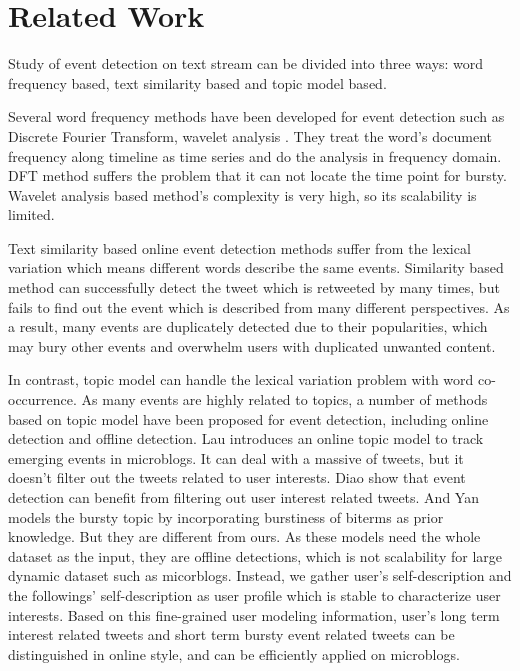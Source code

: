 \documentclass[runningheads,a4paper]{llncs}
\begin{document}
\section{Related Work}
Study of event detection on text stream can be divided into three ways: word frequency based, text similarity based and topic model based.

Several word frequency methods have been developed for event detection such as Discrete Fourier Transform\cite{he2007analyzingDFT}, wavelet analysis \cite{weng2011eventWavelet}.
They treat the word's document frequency along timeline as time series and do the analysis in frequency domain. 
DFT method suffers the problem that it can not locate the time point for bursty.
Wavelet analysis based method's complexity is very high, so its scalability is limited. 

 Text similarity based online event detection methods\cite{petrovic2010streaming}\cite{mccreadiescalable}  suffer from the lexical variation which means different words describe the same events.
 Similarity based method can successfully detect the tweet which is retweeted by many times, but fails to find out the event which is described from many different perspectives.
 As a result, many events are duplicately detected due to their popularities, which may bury other events and overwhelm users with duplicated unwanted content.


In contrast, topic model can handle the lexical variation problem with word co-occurrence\cite{blei2003latent}.
As many events are highly related to topics, a number of methods based on topic model have been proposed for event detection, including online detection and offline detection.
Lau\cite{lau2012line} introduces an online topic model to track emerging events in microblogs.
It can deal with a massive of tweets, but it doesn't filter out the tweets related to user interests.
Diao\cite{timeUserLDA2012finding}\cite{diao2013unified} show that event detection can benefit from filtering out user interest related tweets. 
And Yan\cite{Yan:2015wm} models the bursty topic by incorporating burstiness of biterms as prior knowledge.
But they are different from ours.
As these models need the whole dataset as the input, they are offline detections, which is not scalability for large dynamic dataset such as micorblogs.
Instead, we gather user's self-description and the followings' self-description as user profile which is stable to characterize user interests. 
Based on this fine-grained user modeling information, user's long term interest related tweets and short term bursty event related tweets can be distinguished in online style, and can be efficiently applied on microblogs.
\end{document}
